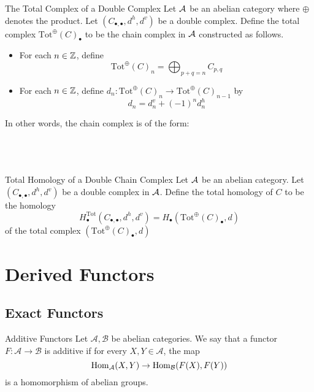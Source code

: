 \documentclass[a4paper]{article}
\begin{document}
\begin{defn}{The Total Complex of a Double Complex}{} Let $\mathcal{A}$ be an abelian category where $\oplus$ denotes the product. Let $(C_{\bullet,\bullet},d^h,d^v)$ be a double complex. Define the total complex $\text{Tot}^\oplus(C)_\bullet$ to be the chain complex in $\mathcal{A}$ constructed as follows. 
\begin{itemize}
\item For each $n\in\mathbb{Z}$, define $$\text{Tot}^\oplus(C)_n=\bigoplus_{p+q=n}C_{p,q}$$
\item For each $n\in\mathbb{Z}$, define $d_n:\text{Tot}^\oplus(C)_n\to\text{Tot}^\oplus(C)_{n-1}$ by $$d_n=d_n^v+(-1)^nd_n^h$$
\end{itemize}
In other words, the chain complex is of the form: \\~\\
\\~\\
\end{defn}

\begin{defn}{Total Homology of a Double Chain Complex}{} Let $\mathcal{A}$ be an abelian category. Let $(C_{\bullet,\bullet},d^h,d^v)$ be a double complex in $\mathcal{A}$. Define the total homology of $C$ to be the homology $$H_\bullet^\text{Tot}(C_{\bullet,\bullet},d^h,d^v)=H_\bullet(\text{Tot}^\oplus(C)_\bullet,d)$$ of the total complex $(\text{Tot}^\oplus(C)_\bullet,d)$
\end{defn}

\pagebreak
\section{Derived Functors}
\subsection{Exact Functors}
\begin{defn}{Additive Functors}{} Let $\mathcal{A},\mathcal{B}$ be abelian categories. We say that a functor $F:\mathcal{A}\to\mathcal{B}$ is additive if for every $X,Y\in\mathcal{A}$, the map $$\operatorname{Hom}_\mathcal{A}(X,Y)\to\operatorname{Hom}_\mathcal{B}(F(X),F(Y))$$ is a homomorphism of abelian groups. 
\end{defn}
\end{document}
